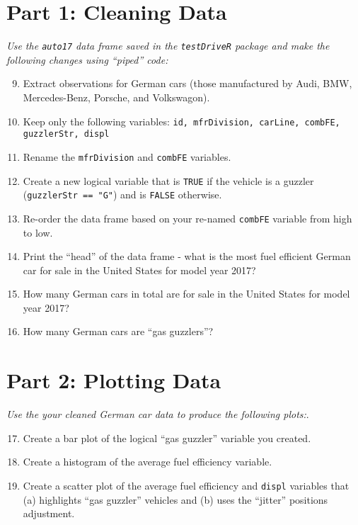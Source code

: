 \documentclass{tufte-handout}
\begin{document}
\vspace{5mm}
\section{Part 1: Cleaning Data}
\textit{Use the \texttt{auto17} data frame saved in the \texttt{testDriveR} package and make the following changes using ``piped'' code:}
\begin{enumerate}
\setcounter{enumi}{8}
\item Extract observations for German cars (those manufactured by Audi, BMW, Mercedes-Benz, Porsche, and Volkswagon). 
\item Keep only the following variables: \texttt{id, mfrDivision, carLine, combFE, guzzlerStr, displ}
\item Rename the \texttt{mfrDivision} and \texttt{combFE} variables.
\item Create a new logical variable that is \texttt{TRUE} if the vehicle is a guzzler (\texttt{guzzlerStr == "G"}) and is \texttt{FALSE} otherwise.
\item Re-order the data frame based on your re-named \texttt{combFE} variable from high to low.
\item Print the ``head'' of the data frame - what is the most fuel efficient German car for sale in the United States for model year 2017?
\item How many German cars in total are for sale in the United States for model year 2017?
\item How many German cars are ``gas guzzlers''?
\end{enumerate}

\vspace{5mm}
\section{Part 2: Plotting Data}
\textit{Use the your cleaned German car data to produce the following plots:}.
\begin{enumerate}
\setcounter{enumi}{16}
\item Create a bar plot of the logical ``gas guzzler'' variable you created.
\item Create a histogram of the average fuel efficiency variable.
\item Create a scatter plot of the average fuel efficiency and \texttt{displ} variables that (a) highlights ``gas guzzler'' vehicles and (b) uses the ``jitter'' positions adjustment.
\end{enumerate}
\end{document}
